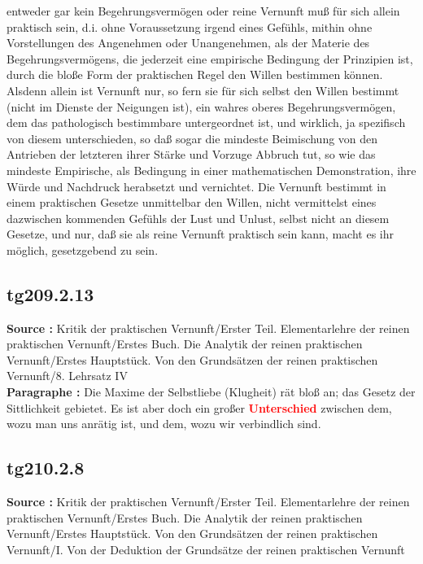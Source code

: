 \documentclass[a4paper,12pt,twoside]{book}
\newcommand{\match}[1]{\textcolor{red}{\textbf{#1}}}
\begin{document}
entweder gar kein Begehrungsvermögen oder reine Vernunft muß für sich allein praktisch sein, d.i. ohne Voraussetzung irgend eines Gefühls, mithin ohne Vorstellungen des Angenehmen oder Unangenehmen, als der Materie des Begehrungsvermögens, die jederzeit eine empirische Bedingung der Prinzipien ist, durch die bloße Form der praktischen Regel den Willen bestimmen können. Alsdenn allein ist Vernunft nur, so fern sie für sich selbst den Willen bestimmt (nicht im Dienste der Neigungen ist), ein wahres oberes Begehrungsvermögen, dem das pathologisch bestimmbare untergeordnet ist, und wirklich, ja spezifisch von diesem unterschieden, so daß sogar die mindeste Beimischung von den Antrieben der letzteren ihrer Stärke und Vorzuge Abbruch tut, so wie das mindeste Empirische, als Bedingung in einer mathematischen Demonstration, ihre Würde und Nachdruck herabsetzt und vernichtet. Die Vernunft bestimmt in einem praktischen Gesetze unmittelbar  den Willen, nicht vermittelst eines dazwischen kommenden Gefühls der Lust und Unlust, selbst nicht an diesem Gesetze, und nur, daß sie als reine Vernunft praktisch sein kann, macht es ihr möglich, gesetzgebend zu sein. 
	
	\subsection*{tg209.2.13} 
	\textbf{Source : }Kritik der praktischen Vernunft/Erster Teil. Elementarlehre der reinen praktischen Vernunft/Erstes Buch. Die Analytik der reinen praktischen Vernunft/Erstes Hauptstück. Von den Grundsätzen der reinen praktischen Vernunft/8. Lehrsatz IV\\  
	
	\noindent\textbf{Paragraphe : }Die Maxime der Selbstliebe (Klugheit) rät bloß an; das Gesetz der Sittlichkeit gebietet. Es ist aber doch ein großer \match{Unterschied} zwischen dem, wozu man uns anrätig ist, und dem, wozu wir verbindlich sind. 
	
	\subsection*{tg210.2.8} 
	\textbf{Source : }Kritik der praktischen Vernunft/Erster Teil. Elementarlehre der reinen praktischen Vernunft/Erstes Buch. Die Analytik der reinen praktischen Vernunft/Erstes Hauptstück. Von den Grundsätzen der reinen praktischen Vernunft/I. Von der Deduktion der Grundsätze der reinen praktischen Vernunft\\  
	
\end{document}
